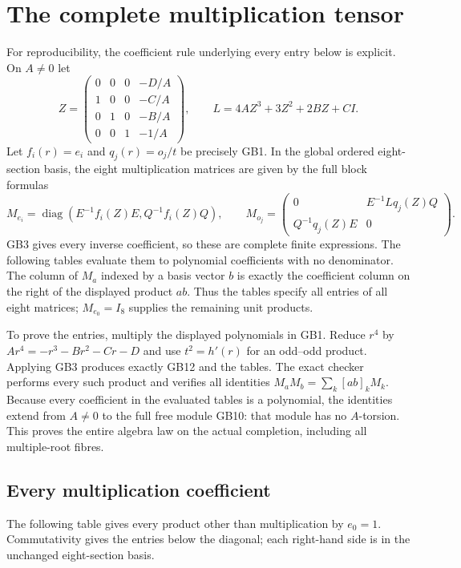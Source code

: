 \documentclass[11pt]{article}
\newcommand{\diag}{\operatorname{diag}}
\begin{document}
\section{The complete multiplication tensor}
For reproducibility, the coefficient rule underlying every
entry below is explicit. On $A\ne0$ let
\begin{equation}
 Z=\begin{pmatrix}
 0&0&0&-D/A\\1&0&0&-C/A\\0&1&0&-B/A\\0&0&1&-1/A
 \end{pmatrix},\qquad
 L=4AZ^3+3Z^2+2BZ+CI.
 \tag{GB11}
\end{equation}
Let $f_i(r)=e_i$ and $q_j(r)=o_j/t$ be precisely GB1.
In the global ordered eight-section basis, the eight
multiplication matrices are given by the full block formulas
\begin{equation}
 M_{e_i}=\diag(E^{-1}f_i(Z)E,Q^{-1}f_i(Z)Q),\qquad
 M_{o_j}=
 \begin{pmatrix}
 0&E^{-1}Lq_j(Z)Q\\Q^{-1}q_j(Z)E&0
 \end{pmatrix}.
 \tag{GB12}
\end{equation}
GB3 gives every inverse coefficient, so these are complete
finite expressions. The following tables evaluate them to
polynomial coefficients with no denominator. The column of
$M_a$ indexed by a basis vector $b$ is exactly the coefficient
column on the right of the displayed product $ab$.
Thus the tables specify all entries of all eight matrices;
$M_{e_0}=I_8$ supplies the remaining unit products.

To prove the entries, multiply the displayed polynomials in
GB1. Reduce $r^4$ by $Ar^4=-r^3-Br^2-Cr-D$ and use
$t^2=h'(r)$ for an odd--odd product. Applying GB3 produces
exactly GB12 and the tables. The exact checker performs every
such product and verifies all identities
$M_aM_b=\sum_k[ab]_kM_k$.
Because every coefficient in the evaluated tables is a
polynomial, the identities extend from $A\ne0$ to the full
free module GB10: that module has no $A$-torsion.
This proves the entire algebra law on the actual completion,
including all multiple-root fibres.

\subsection{Every multiplication coefficient}
The following table gives every product other than multiplication by $e_0=1$.
Commutativity gives the entries below the diagonal; each right-hand side is in the unchanged eight-section basis.
\end{document}
